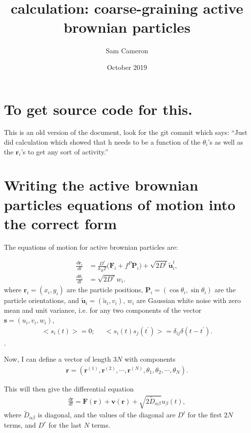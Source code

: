 \documentclass{article}
\title{calculation: coarse-graining active brownian particles}
\author{Sam Cameron}
\date{October 2019}
\begin{document}
\maketitle

\section{To get source code for this.}

This is an old version of the document, look for the git commit which says:
``Just did calculation which showed that h needs to be a function of the $\theta_i$'s as well
as the $\bm{r}_i$'s to get any sort of activity.''

\section{Writing the active brownian particles equations of motion into the correct form}



The equations of motion for active brownian particles are:

\begin{align}
  \frac{d\bm{r}_i}{dt}&=\frac{D^t}{k_BT}\big(\bm{F}_i
                        +f^P\bm{P}_i\big)
                        +\sqrt{2D^t}\tilde{\bm{u}}_i^t,\label{eq:micro_pos}\\
    \frac{d\theta_i}{dt}&=\sqrt{2D^r}w_i.\label{eq:micro_theta}
\end{align}
where $\bm{r}_i=(x_i,y_i)$ are the particle positions,
$\bm{P}_i=(\cos\theta_i,\sin\theta_i)$ are the particle orientations,
and $\tilde{\bm{u}}_i=(\tilde{u}_i,v_i)$, $w_i$ are Gaussian white noise
with zero mean and unit variance, i.e. for any two components of the vector
$\bm{s}=(u_i,v_i,w_i)$,
\begin{align}
  \big<s_i(t)\big>=0;\;\;\;\;\; \big<s_i(t)s_j(t^{\prime})\big>=
  \delta_{ij}\delta(t-t^{\prime}).
\end{align}.

Now, I can define a vector of length $3N$ with components
\begin{align}
  \bm{r}=(\bm{r}^{(1)},\bm{r}^{(2)},\cdots,\bm{r}^{(N)},\theta_1,\theta_2,\cdots,
  \theta_N).
\end{align}

This will then give the differential equation
\begin{align}
  \frac{d\bm{r}}{dt}=\bm{F}(\bm{r})+\bm{v}(\bm{r})
  +\sqrt{2\tilde{D}_{\alpha\beta}}u_{\beta}(t),
\end{align}
where $\tilde{D}_{\alpha\beta}$ is diagonal, and the values of the diagonal are
$D^t$ for the first $2N$ terms, and $D^r$ for the last $N$ terms.
\end{document}
